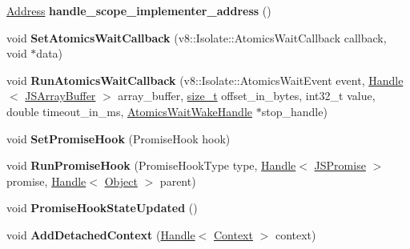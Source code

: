 \begin{DoxyCompactItemize}
\mbox{\label{classv8_1_1internal_1_1Isolate_a6022c7c8be9ad0c862fa12480c7f1929}} 
\mbox{\hyperlink{classuintptr__t}{Address}} {\bfseries handle\+\_\+scope\+\_\+implementer\+\_\+address} ()
\item 
\mbox{\label{classv8_1_1internal_1_1Isolate_a6bc51f32fe56718d2780eb8234926e56}} 
void {\bfseries Set\+Atomics\+Wait\+Callback} (v8\+::\+Isolate\+::\+Atomics\+Wait\+Callback callback, void $\ast$data)
\item 
\mbox{\label{classv8_1_1internal_1_1Isolate_ab81e7811ea20f641954d7d51a5c3e41c}} 
void {\bfseries Run\+Atomics\+Wait\+Callback} (v8\+::\+Isolate\+::\+Atomics\+Wait\+Event event, \mbox{\hyperlink{classv8_1_1internal_1_1Handle}{Handle}}$<$ \mbox{\hyperlink{classv8_1_1internal_1_1JSArrayBuffer}{J\+S\+Array\+Buffer}} $>$ array\+\_\+buffer, \mbox{\hyperlink{classsize__t}{size\+\_\+t}} offset\+\_\+in\+\_\+bytes, int32\+\_\+t value, double timeout\+\_\+in\+\_\+ms, \mbox{\hyperlink{classv8_1_1internal_1_1AtomicsWaitWakeHandle}{Atomics\+Wait\+Wake\+Handle}} $\ast$stop\+\_\+handle)
\item 
\mbox{\label{classv8_1_1internal_1_1Isolate_a1d0d918d08cd185cf2f5f2dec9f03ea2}} 
void {\bfseries Set\+Promise\+Hook} (Promise\+Hook hook)
\item 
\mbox{\label{classv8_1_1internal_1_1Isolate_ad01c2016a7185a241a1fa71e346950b3}} 
void {\bfseries Run\+Promise\+Hook} (Promise\+Hook\+Type type, \mbox{\hyperlink{classv8_1_1internal_1_1Handle}{Handle}}$<$ \mbox{\hyperlink{classv8_1_1internal_1_1JSPromise}{J\+S\+Promise}} $>$ promise, \mbox{\hyperlink{classv8_1_1internal_1_1Handle}{Handle}}$<$ \mbox{\hyperlink{classv8_1_1internal_1_1Object}{Object}} $>$ parent)
\item 
\mbox{\label{classv8_1_1internal_1_1Isolate_ab92a5ea1943e0c8f39a92b0ff8d901c9}} 
void {\bfseries Promise\+Hook\+State\+Updated} ()
\item 
\mbox{\label{classv8_1_1internal_1_1Isolate_a5a8bf062e8557dfc4ce8f17c5bc90c33}} 
void {\bfseries Add\+Detached\+Context} (\mbox{\hyperlink{classv8_1_1internal_1_1Handle}{Handle}}$<$ \mbox{\hyperlink{classv8_1_1internal_1_1Context}{Context}} $>$ context)

\end{DoxyCompactItemize}
